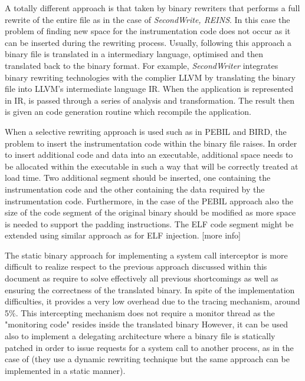 A totally different approach is that taken by binary rewriters that performs a full rewrite of the entire file as in the case of \emph{SecondWrite, REINS}.  In this case the problem of finding new space for the instrumentation code does not occur as it can be inserted during the rewriting process. Usually, following this approach a binary file is translated in a intermediary language, optimised and then translated back to the binary format. For example, \emph{SecondWriter} integrates binary rewriting technologies with the complier LLVM \cite{LLVM} by translating the binary file into LLVM's intermediate language IR. When the application is represented in IR, is passed through a series of analysis and transformation. The result then is given an code generation routine which recompile the application.   


When a selective rewriting approach is used such as in PEBIL and BIRD, the problem to insert the instrumentation code within the binary file raises. In order to insert  additional code and data into an executable, additional space needs to be allocated within the executable in such a way that will be correctly treated at load time. Two additional segment should be inserted, one containing the instrumentation code and the other containing the data required by the instrumentation code. Furthermore, in the case of the PEBIL approach also the size of the code segment of the original binary should be modified as more space is needed to support the padding instructions. The ELF code segment might be extended using similar approach as for ELF injection. 
[more info]


The static binary approach for implementing a system call interceptor is more difficult to realize respect to the previous approach discussed within this document as require to solve effectively all previous shortcomings as well as ensuring the correctness of the translated binary. In spite of the implementation difficulties, it provides a very low overhead due to the tracing mechanism, around 5\%. This intercepting mechanism does not require a monitor thread as the "monitoring code" resides inside the translated binary
However, it can be used also to implement a delegating architecture where a binary file is statically patched in order to issue requests for a system call to another process, as in the case of \cite{seccompsandbox,vx32} (they use a dynamic rewriting technique but the same approach can be implemented in a static manner). 

